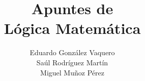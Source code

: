 \documentclass{report}
\theoremstyle{definition}
\theoremstyle{remark}
\numberwithin{section}{chapter}
\numberwithin{equation}{chapter}
\begin{document}
\frontmatter

\title{Apuntes de\\ Lógica Matemática}


\author{Eduardo González Vaquero\\ Saúl Rodríguez Martín\\ Miguel Muñoz Pérez}

\maketitle



\tableofcontents
{}



\mainmatter



\appendix

\backmatter

\printindex
\end{document}
